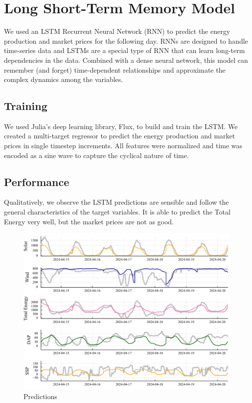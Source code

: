 \documentclass[
  journal,
]{IEEEtran}%
\begin{document}
\section{Long Short-Term Memory
Model}\label{long-short-term-memory-model}

We used an LSTM Recurrent Neural Network (RNN) to predict the energy
production and market prices for the following day. RNNs are designed to
handle time-series data and LSTMs are a special type of RNN that can
learn long-term dependencies in the data. Combined with a dense neural
network, this model can remember (and forget) time-dependent
relationships and approximate the complex dynamics among the variables.

\subsection{Training}\label{training}

We used Julia's deep learning library, Flux, to build and train the
LSTM. We created a multi-target regressor to predict the energy
production and market prices in single timestep increments. All features
were normalized and time was encoded as a sine wave to capture the
cyclical nature of time.

\subsection{Performance}\label{performance}

Qualitatively, we observe the LSTM predictions are sensible and follow
the general characteristics of the target variables. It is able to
predict the Total Energy very well, but the market prices are not as
good.

\begin{figure}

{\centering \includegraphics{EnergyProdConformalLSTM_files/mediabag/EnergyProdConformalLSTM_files/figure-pdf/plot-predictions-output-1.pdf}

}

\caption{Predictions}

\end{figure}%
\end{document}

